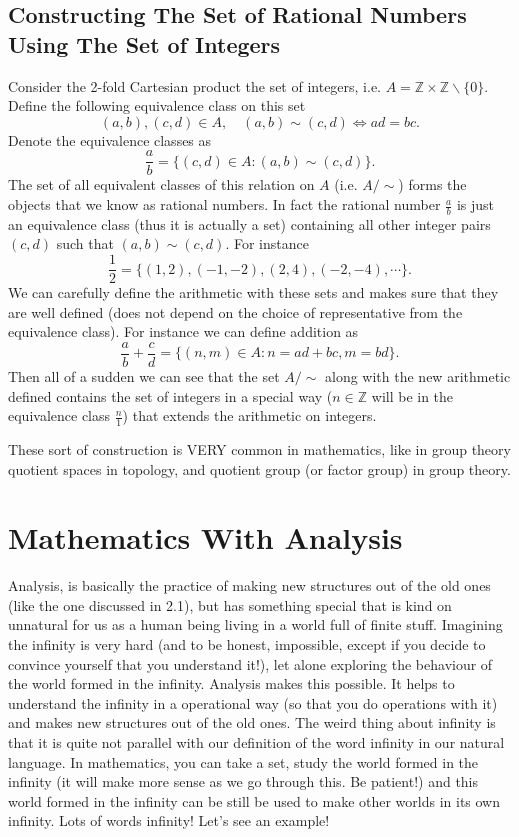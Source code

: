 \documentclass[12pt,a4paper]{article}
\newcommand{\Z}{\mathbb{Z}}
\begin{document}
	\subsection{Constructing The Set of Rational Numbers Using The Set of Integers}
	Consider the 2-fold Cartesian product the set of integers, i.e. $A = \Z \times \Z\backslash\{0\}$. Define the following equivalence class on this set 
	\[(a,b), (c,d) \in A, \quad (a,b) \sim (c,d) \Longleftrightarrow ad = bc. \]
	Denote the equivalence classes as
	\[ \frac{a}{b} = \{ (c,d)\in A: (a,b)\sim(c,d)\}. \]
	The set of all equivalent classes of this relation on $A$ (i.e. $A/\!\sim$) forms the objects that we know as rational numbers. In fact the rational number $\frac{a}{b}$ is just an equivalence class (thus it is actually a set) containing all other integer pairs $(c,d)$ such that $(a,b)\sim(c,d)$. For instance
	\[ \frac{1}{2} = \{ (1,2),(-1,-2),(2,4),(-2,-4),\cdots \}. \]
	We can carefully define the arithmetic with these sets and makes sure that they are well defined (does not depend on the choice of representative from the equivalence class). For instance we can define addition as
	\[ \frac{a}{b} + \frac{c}{d} = \{ (n,m) \in A: n = ad+bc, m=bd \}. \] 
	Then all of a sudden we can see that the set $A/\!\sim$ along with the new arithmetic defined contains the set of integers in a special way ($n\in\Z$ will be in the equivalence class $\frac{n}{1}$) that extends the arithmetic on integers.
	
	These sort of construction is VERY common in mathematics, like in group theory quotient spaces in topology, and quotient group (or factor group) in group theory.

	
	\section{Mathematics With Analysis}
	Analysis, is basically the practice of making new structures out of the old ones (like the one discussed in 2.1), but has something special that is kind on unnatural for us as a human being living in a world full of finite stuff. Imagining the infinity is very hard (and to be honest, impossible, except if you decide to convince yourself that you understand it!), let alone exploring the behaviour of the world formed in the infinity. Analysis makes this possible. It helps to understand the infinity in a operational way (so that you do operations with it) and makes new structures out of the old ones. The weird thing about infinity is that it is quite not parallel with our definition of the word infinity in our natural language. In mathematics, you can take a set, study the world formed in the infinity (it will make more sense as we go through this. Be patient!) and this world formed in the infinity can be still be used to make other worlds in its own infinity. Lots of words infinity! Let's see an example!
\end{document}
